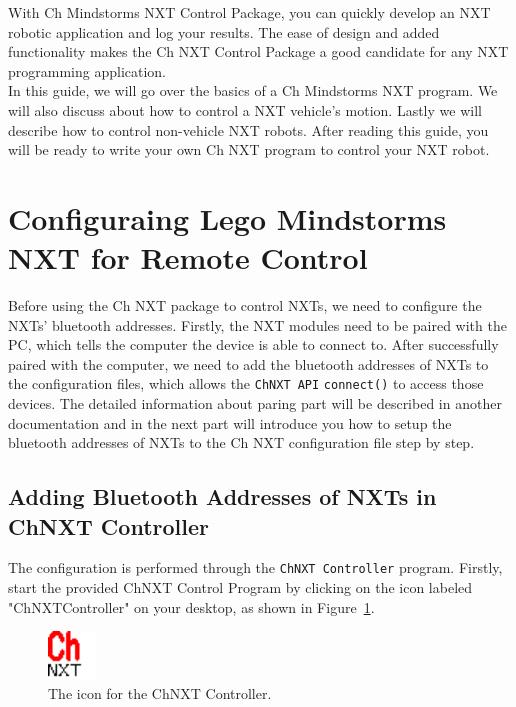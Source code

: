 \documentclass[11pt]{article}
\begin{document}
\noindent
With Ch Mindstorms NXT Control Package, you can quickly develop an NXT robotic application and log 
your results. The ease of design and added functionality makes the Ch NXT Control Package a good 
candidate for any NXT programming application.\\
\newline
In this guide, we will go over the basics of a Ch Mindstorms NXT program. We will also discuss 
about how to control a NXT vehicle's motion. Lastly we will describe how to control non-vehicle
NXT robots. After reading this guide, you will be ready to write your own Ch NXT program to 
control your NXT robot.

\newpage
\section{Configuraing Lego Mindstorms NXT for Remote Control}
Before using the Ch NXT package to control NXTs, we need to configure the NXTs' bluetooth addresses.
Firstly, the NXT modules need to be paired with the PC, which tells the computer the device is able
to connect to. After successfully paired with the computer, we need to add the bluetooth addresses of
NXTs to the configuration files, which allows the \texttt{ChNXT API} \texttt{connect()} to access
those devices. The detailed information about paring part will be described in another documentation
and in the next part will introduce you how to setup the bluetooth addresses of NXTs to the Ch NXT
configuration file step by step.

\subsection{Adding Bluetooth Addresses of NXTs in ChNXT Controller}
The configuration is performed through the \texttt{ChNXT Controller} program. Firstly, start the 
provided ChNXT Control Program by clicking on the icon labeled "ChNXTController" on your desktop,
as shown in Figure~\ref{fig:chnxt_icon}.

\begin{figure}[H]
  \begin{center}
    \includegraphics[height=0.5in]{figure/configuration/chnxt.png}
    \caption{The icon for the ChNXT Controller.\label{fig:chnxt_icon}}
  \end{center}
\end{figure}
\end{document}

